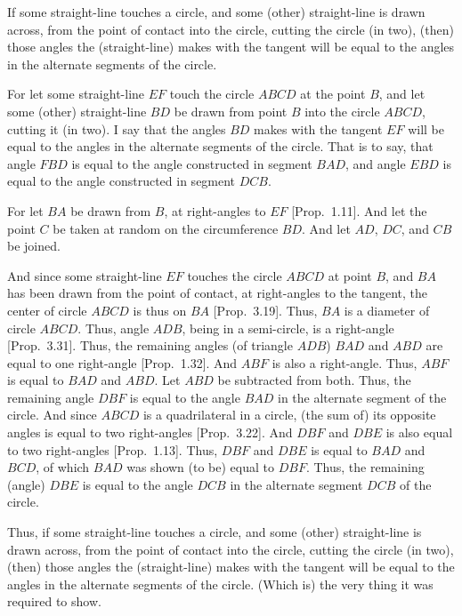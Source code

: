 \begin{Parallel}{}{}
{If some straight-line touches a circle, and some (other) straight-line is drawn  
across, from the point of contact into the circle,  cutting the circle (in two), (then) those angles  the (straight-line) makes
with the tangent will be equal to the angles in
the alternate segments of the circle.

\epsfysize=2.1in
\centerline{}

For let some straight-line $EF$ touch the circle $ABCD$ at the point $B$, and let
some (other) straight-line $BD$ be drawn from point $B$ into the
circle $ABCD$, cutting it (in two). I say that the angles $BD$ makes with the tangent 
$EF$  will be equal to the angles in the alternate segments of the circle.
That is to say, that angle $FBD$ is equal to the angle constructed
in segment $BAD$, and angle $EBD$ is equal to the angle constructed in segment $DCB$.

For let $BA$ be drawn from $B$, at right-angles to $EF$ [Prop.~1.11].
And let the point $C$ be taken at random on the circumference $BD$. And
let $AD$, $DC$, and $CB$ be joined.

And since some straight-line $EF$ touches the circle $ABCD$ at point $B$, and
$BA$ has been drawn from the point of contact, at right-angles to the
tangent, the center of circle $ABCD$ is thus on $BA$ [Prop.~3.19].
Thus, $BA$ is a diameter of circle $ABCD$.
Thus, angle $ADB$, being in a semi-circle, is a right-angle [Prop.~3.31].
Thus, the remaining angles (of triangle $ADB$) $BAD$ and $ABD$ are equal to one right-angle [Prop.~1.32]. And $ABF$ is also a right-angle. Thus,
$ABF$ is equal to $BAD$ and $ABD$. Let $ABD$ be subtracted from both.
Thus, the remaining angle $DBF$ is equal to the angle $BAD$ in the alternate
segment of the circle. And since $ABCD$ is a quadrilateral in a circle,
(the sum of) its opposite angles is equal to two right-angles [Prop.~3.22]. And $DBF$ and $DBE$ is also equal to two right-angles [Prop.~1.13]. Thus, $DBF$ and $DBE$ is equal to $BAD$ and $BCD$, of which
$BAD$ was shown (to be) equal to $DBF$. Thus, the remaining (angle) $DBE$ is
equal to the angle $DCB$ in the alternate segment $DCB$ of the circle.

Thus, if some straight-line touches a circle, and some (other) straight-line is drawn  across, from the point of contact into the circle,  cutting the circle (in two), (then) those angles  the (straight-line) makes
with the tangent will be equal to the angles in
the alternate segments of the circle. (Which is) the very thing it was required to
show.}
\end{Parallel}

